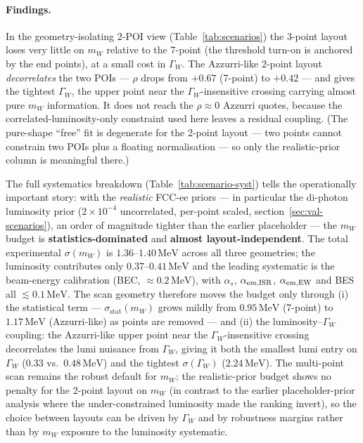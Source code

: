 \documentclass[11pt,a4paper]{article}
\newcommand{\mW}{m_W}
\newcommand{\GammaW}{\Gamma_W}
\newcommand{\MeV}{\ensuremath{\,\mathrm{MeV}}}
\begin{document}
\paragraph{Findings.}
In the geometry-isolating 2-POI view (Table~\ref{tab:scenarios}) the
3-point layout loses very little on $\mW$ relative to the 7-point (the
threshold turn-on is anchored by the end points), at a small cost in
$\GammaW$. The Azzurri-like 2-point layout \emph{decorrelates} the two POIs
--- $\rho$ drops from $+0.67$ (7-point) to $+0.42$ --- and gives the tightest
$\GammaW$, the upper point near the $\GammaW$-insensitive crossing carrying
almost pure $\mW$ information. It does not reach the $\rho\!\approx\!0$
Azzurri quotes, because the correlated-luminosity-only constraint used here
leaves a residual coupling. (The pure-shape ``free'' fit is degenerate for
the 2-point layout --- two points cannot constrain two POIs plus a floating
normalisation --- so only the realistic-prior column is meaningful there.)

The full systematics breakdown (Table~\ref{tab:scenario-syst}) tells the
operationally important story: with the \emph{realistic} FCC-ee priors --- in
particular the di-photon luminosity prior ($2\!\times\!10^{-4}$ uncorrelated,
per-point scaled, section~\ref{sec:val-scenarios}), an order of magnitude tighter
than the earlier placeholder --- the $\mW$ budget is \textbf{statistics-dominated}
and \textbf{almost layout-independent}. The total experimental $\sigma(\mW)$ is
$1.36$--$1.40\MeV$ across all three geometries; the luminosity contributes only
$0.37$--$0.41\MeV$ and the leading systematic is the beam-energy calibration
(BEC, $\approx0.2\MeV$), with $\alpha_s$, $\alpha_{\rm em,ISR}$,
$\alpha_{\rm em,EW}$ and BES all $\lesssim\!0.1\MeV$. The scan geometry therefore moves the budget only through
(i) the statistical term --- $\sigma_\text{stat}(\mW)$ grows mildly from
$0.95\MeV$ (7-point) to $1.17\MeV$ (Azzurri-like) as points are removed --- and
(ii) the luminosity--$\GammaW$ coupling: the Azzurri-like upper point near the
$\GammaW$-insensitive crossing decorrelates the lumi nuisance from $\GammaW$,
giving it both the smallest lumi entry on $\GammaW$ ($0.33$ vs.\ $0.48\MeV$) and
the tightest $\sigma(\GammaW)$ ($2.24\MeV$). The multi-point scan remains the
robust default for $\mW$; the realistic-prior budget shows no penalty for the
2-point layout on $\mW$ (in contrast to the earlier placeholder-prior analysis
where the under-constrained luminosity made the ranking invert), so the choice
between layouts can be driven by $\GammaW$ and by robustness margins rather than
by $\mW$ exposure to the luminosity systematic.
\end{document}

